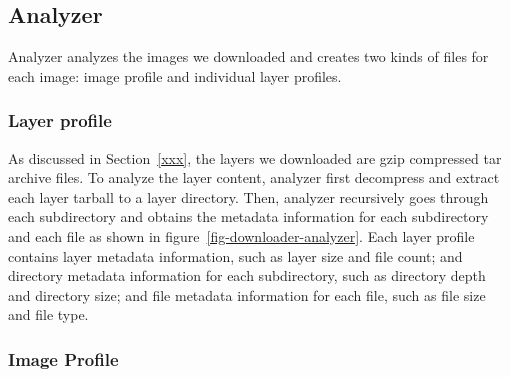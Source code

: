 \subsection{Analyzer}

Analyzer analyzes the images we downloaded and creates two kinds of files
for each image: image profile and individual layer profiles.
%
%
\subsubsection{Layer profile}

As discussed in Section~\ref{xxx}, the layers we downloaded are gzip
compressed tar archive files.
%
To analyze the layer content, analyzer first decompress and extract each
layer tarball to a layer directory.
%
Then, analyzer recursively goes through each subdirectory and obtains
the metadata information for each subdirectory and each file as shown
in figure~\ref{fig-downloader-analyzer}. Each layer profile contains
layer metadata information, such as layer size and file count; and
directory metadata information for each subdirectory, such as directory
depth and directory size; and file metadata information for each file,
such as file size and file type.
%






\subsubsection{Image Profile}

